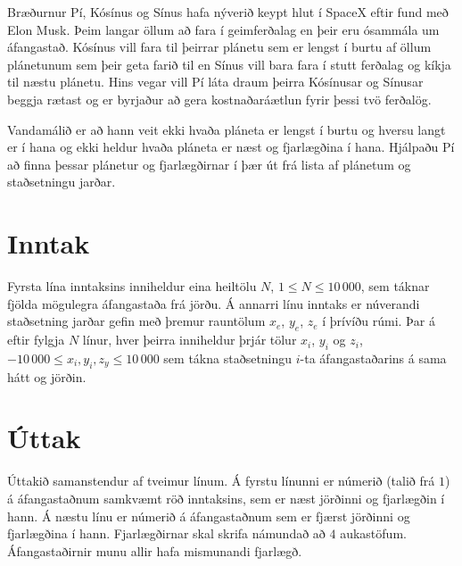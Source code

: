 

Bræðurnur Pí, Kósínus og Sínus hafa nýverið keypt hlut í SpaceX eftir fund með
Elon Musk. Þeim langar öllum að fara í geimferðalag en þeir eru ósammála um
áfangastað. Kósínus vill fara til þeirrar plánetu sem er lengst í burtu af
öllum plánetunum sem þeir geta farið til en Sínus vill bara fara í stutt
ferðalag og kíkja til næstu plánetu. Hins vegar vill Pí láta draum þeirra
Kósínusar og Sínusar beggja rætast og er byrjaður að gera kostnaðaráætlun fyrir
þessi tvö ferðalög.

Vandamálið er að hann veit ekki hvaða pláneta er lengst í burtu og hversu langt
er í hana og ekki heldur hvaða pláneta er næst og fjarlægðina í hana. Hjálpaðu
Pí að finna þessar plánetur og fjarlægðirnar í þær út frá lista af plánetum og
staðsetningu jarðar.

\section*{Inntak}
Fyrsta lína inntaksins inniheldur eina heiltölu $N$, $1 \leq N \leq
10\,000$, sem táknar fjölda mögulegra áfangastaða frá jörðu. Á annarri línu
inntaks er núverandi staðsetning jarðar gefin með þremur rauntölum $x_e$,
$y_e$, $z_e$ í þrívíðu rúmi. Þar á eftir fylgja $N$ línur, hver þeirra
inniheldur þrjár tölur $x_i$, $y_i$ og $z_i$, $-10\,000 \leq x_i,y_i,z_y \leq
10\,000$ sem tákna staðsetningu $i$-ta áfangastaðarins á sama hátt og jörðin.

\section*{Úttak}
Úttakið samanstendur af tveimur línum. Á fyrstu línunni er númerið (talið frá
$1$) á áfangastaðnum samkvæmt röð inntaksins, sem er næst jörðinni og
fjarlægðin í hann. Á næstu línu er númerið á áfangastaðnum sem er fjærst
jörðinni og fjarlægðina í hann. Fjarlægðirnar skal skrifa námundað að $4$
aukastöfum. Áfangastaðirnir munu allir hafa mismunandi fjarlægð.
